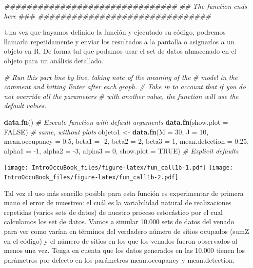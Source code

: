 \documentclass[
]{book}
\newenvironment{Shaded}{\begin{snugshade}}{\end{snugshade}}
\newcommand{\AlertTok}[1]{\textcolor[rgb]{0.94,0.16,0.16}{#1}}
\newcommand{\CommentTok}[1]{\textcolor[rgb]{0.56,0.35,0.01}{\textit{#1}}}
\newcommand{\DataTypeTok}[1]{\textcolor[rgb]{0.13,0.29,0.53}{#1}}
\newcommand{\DecValTok}[1]{\textcolor[rgb]{0.00,0.00,0.81}{#1}}
\newcommand{\FloatTok}[1]{\textcolor[rgb]{0.00,0.00,0.81}{#1}}
\newcommand{\KeywordTok}[1]{\textcolor[rgb]{0.13,0.29,0.53}{\textbf{#1}}}
\newcommand{\NormalTok}[1]{#1}
\newcommand{\OtherTok}[1]{\textcolor[rgb]{0.56,0.35,0.01}{#1}}
\newcommand{\StringTok}[1]{\textcolor[rgb]{0.31,0.60,0.02}{#1}}
\begin{document}
\begin{Shaded}
\begin{Highlighting}[]
\CommentTok{###############################}
\CommentTok{## The function ends  here  }\AlertTok{###}
\CommentTok{###############################}
\end{Highlighting}
\end{Shaded}

Una vez que hayamos definido la función y ejecutado su código, podremos llamarla repetidamente y enviar los resultados a la pantalla o asignarlos a un objeto en R. De forma tal que podamos usar el set de datos almacenado en el objeto para un análisis detallado.

\begin{Shaded}
\begin{Highlighting}[]
\CommentTok{# Run this part line by line, taking note of the meaning of the }
\CommentTok{# model in the comment and hitting Enter after each graph.}
\CommentTok{# Take in to account that if you do not override all the parameters}
\CommentTok{# with another value, the function will use the default values.}

\KeywordTok{data.fn}\NormalTok{()                  }\CommentTok{# Execute function with default arguments}
\KeywordTok{data.fn}\NormalTok{(}\DataTypeTok{show.plot =} \OtherTok{FALSE}\NormalTok{) }\CommentTok{# same, without plots}
\NormalTok{objeto1 <-}\StringTok{ }\KeywordTok{data.fn}\NormalTok{(}\DataTypeTok{M =} \DecValTok{30}\NormalTok{, }\DataTypeTok{J =} \DecValTok{10}\NormalTok{, }\DataTypeTok{mean.occupancy =} \FloatTok{0.5}\NormalTok{, }
                   \DataTypeTok{beta1 =} \DecValTok{-2}\NormalTok{, }\DataTypeTok{beta2 =} \DecValTok{2}\NormalTok{, }\DataTypeTok{beta3 =} \DecValTok{1}\NormalTok{, }
                   \DataTypeTok{mean.detection =} \FloatTok{0.25}\NormalTok{, }\DataTypeTok{alpha1 =} \DecValTok{-1}\NormalTok{,}
                   \DataTypeTok{alpha2 =} \DecValTok{-3}\NormalTok{, }\DataTypeTok{alpha3 =} \DecValTok{0}\NormalTok{, }\DataTypeTok{show.plot =} \OtherTok{TRUE}\NormalTok{) }\CommentTok{# Explicit defaults}
\end{Highlighting}
\end{Shaded}

\texttt{[image: IntroOccuBook\_files/figure-latex/fun\_call1b-1.pdf]} \texttt{[image: IntroOccuBook\_files/figure-latex/fun\_call1b-2.pdf]}

Tal vez el uso más sencillo posible para esta función es experimentar de primera mano el error de muestreo: el cuál es la variabilidad natural de realizaciones repetidas (varios sets de datos) de nuestro proceso estocástico por el cual calculamos los set de datos. Vamos a simular 10.000 sets de datos del venado para ver como varían en términos del verdadero número de sitios ocupados (sumZ en el código) y el número de sitios en los que los venados fueron observados al menos una vez. Tenga en cuenta que los datos generados en las 10.000 tienen los parámetros por defecto en los parámetros mean.occupancy y mean.detection.
\end{document}
